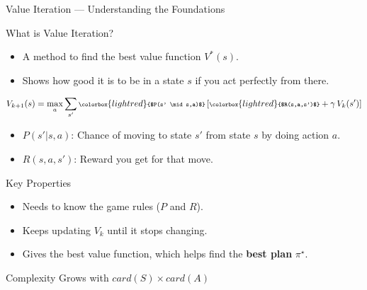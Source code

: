 \documentclass[aspectratio=169,xcolor=dvipsnames]{beamer}
\begin{document}
\begin{frame}{Value Iteration — Understanding the Foundations}  

\begin{block}{What is Value Iteration?}
\begin{itemize}
    \item A method to find the best value function \( V^*(s) \).
    \item Shows how good it is to be in a state \( s \) if you act perfectly from there.
\end{itemize}
\end{block}

\[
    \scriptsize
    V_{k+1}(s) = \max_{a} \sum_{s'} 
    \colorbox{lightred}{$P(s' \mid s,a)$} 
    \left[ \colorbox{lightred}{$R(s,a,s')$} + \gamma \, V_k(s') \right]
\]

\begin{itemize}
    \small
    \item \( P(s'|s,a) \): Chance of moving to state \( s' \) from state \( s \) by doing action \( a \).
    \item \( R(s,a,s') \): Reward you get for that move.
\end{itemize}

\begin{minipage}{0.75\textwidth}
    \begin{block}{Key Properties}
    \begin{itemize}
        \item Needs to know the game rules (\colorbox{lightred}{\( P \)} and \colorbox{lightred}{\( R \)}).
        \item Keeps updating \( V_k \) until it stops changing.
        \item Gives the best value function, which helps find the \textbf{best plan} $\pi^{\star}$.
    \end{itemize}
    \end{block}
\end{minipage}%
\hfill %
\begin{minipage}{0.2\textwidth}
    \centering
    \begin{alertblock}{Complexity}
        Grows with $card(S) \times card(A)$ 
    \end{alertblock}
\end{minipage}

\end{frame}

\end{document}
